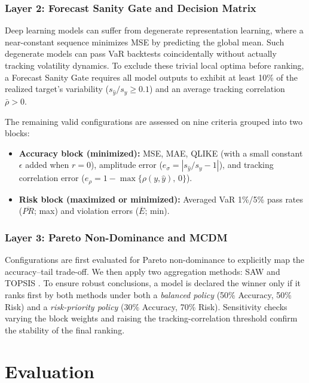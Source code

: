 \documentclass[runningheads]{llncs}
\begin{document}
\subsubsection{Layer 2: Forecast Sanity Gate and Decision Matrix}
Deep learning models can suffer from degenerate representation learning, where a near-constant sequence minimizes MSE by predicting the global mean. Such degenerate models can pass VaR backtests coincidentally without actually tracking volatility dynamics. To exclude these trivial local optima before ranking, a Forecast Sanity Gate requires all model outputs to exhibit at least 10\% of the realized target's variability (\(s_{\hat{y}}/s_y \geq 0.1\)) and an average tracking correlation \(\bar{\rho} > 0\). 

The remaining valid configurations are assessed on nine criteria grouped into two blocks:
\begin{itemize}
    \item \textbf{Accuracy block (minimized):} MSE, MAE, QLIKE (with a small constant \(\epsilon\) added when \(r=0\)), amplitude error (\(e_\sigma = |s_{\hat{y}}/s_y - 1|\)), and tracking correlation error (\(e_\rho = 1 - \max\{\rho(y,\hat{y}),\,0\}\)).
    \item \textbf{Risk block (maximized or minimized):} Averaged VaR 1\%/5\% pass rates (\(\overline{PR}\); max) and violation errors (\(\overline{E}\); min).
\end{itemize}

\subsubsection{Layer 3: Pareto Non-Dominance and MCDM}
Configurations are first evaluated for Pareto non-dominance to explicitly map the accuracy--tail trade-off. We then apply two aggregation methods: SAW \cite{triantaphyllou2000} and TOPSIS \cite{hwang1981,behzadian2012}. To ensure robust conclusions, a model is declared the winner only if it ranks first by both methods under both a \emph{balanced policy} (50\% Accuracy, 50\% Risk) and a \emph{risk-priority policy} (30\% Accuracy, 70\% Risk). Sensitivity checks varying the block weights and raising the tracking-correlation threshold confirm the stability of the final ranking.



\section{Evaluation}
\end{document}
